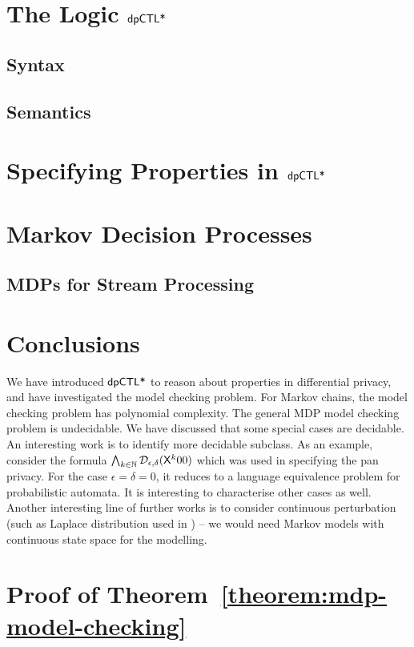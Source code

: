 \documentclass{llncs}
\begin{document}
\section{The Logic $\textsf{dpCTL*}$}
\label{section:dpCTL}


\subsection{Syntax}
\label{subsection:syntax}


\subsection{Semantics}
\label{subsection:semantics}


\section{Specifying Properties in $\textsf{dpCTL*}$}
\label{section:specifying-properties}


\section{Markov Decision Processes}
\label{section:mdp}


%


\subsection{MDPs for Stream Processing}
\label{section:applications}


\section{Conclusions}
\label{section:conclusions}
We have introduced $\textsf{dpCTL*}$ to reason about properties in differential privacy, and have investigated the model checking problem. For Markov chains, the model checking problem has polynomial complexity. The general MDP model checking problem is undecidable. We have discussed that some special cases are decidable. An interesting work is to identify more
decidable subclass. As an example, consider the formula $\bigwedge_{k \in \mathbb{N}}
\mathcal{D}_{{\epsilon}, {\delta}} (\mathsf{X}^k  00)$ which was used in specifying the pan privacy. For the case $\epsilon=\delta=0$, it reduces to a language equivalence problem for probabilistic automata. It is interesting to characterise other cases as well.
 Another interesting line of further works is to consider continuous perturbation (such as Laplace distribution used in \cite{DR:14:AFDP}) -- we would need Markov models with continuous state space for the modelling.





\newpage
\appendix

\section{Proof of Theorem~\ref{theorem:mdp-model-checking}}

\end{document}
